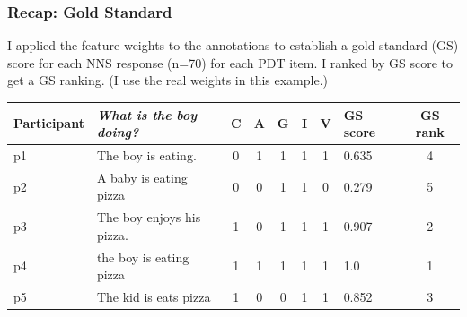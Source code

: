 \documentclass[xcolor={dvipsnames}]{beamer}
\begin{document}
\begin{frame}
\frametitle{Recap: Gold Standard}
\scriptsize
I applied the feature weights to the annotations to establish a gold standard (GS) score for each NNS response (n=70) for each PDT item. I ranked by GS score to get a GS ranking. (I use the real weights in this example.)
\begin{table}
\tiny
\begin{center}
\begin{tabular}{|l|l|c|c|c|c|c||l|c|}
\hline
Participant & \textit{What is the boy doing?} & C & A & G & I & V & \tiny{GS score} & \tiny{GS rank} \\
\hline
p1 & The boy is eating. & 0 & 1 & 1 & 1 & 1 & 0.635 & 4 \\
\hline
p2 & A baby is eating pizza & 0 & 0 & 1 & 1 & 0 & 0.279 & 5 \\
\hline
p3 & The boy enjoys his pizza. & 1 & 0 & 1 & 1 & 1 & 0.907 & 2 \\
\hline
p4 & the boy is eating pizza & 1 & 1 & 1 & 1 & 1 & 1.0 & 1 \\
\hline
p5 & The kid is eats pizza & 1 & 0 & 0 & 1 & 1 & 0.852 & 3 \\
\hline
\end{tabular}
\end{center}
\end{table}

\end{frame}
\end{document}
